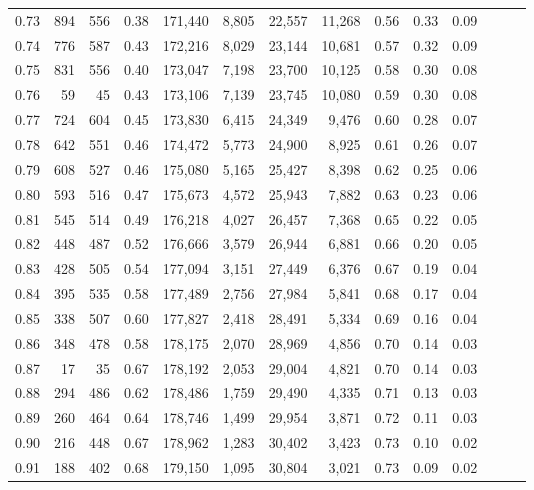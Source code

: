 \begin{tabular}{rrrrrrrrrrrrrr}
0.73 &    894 &  556 &  0.38 &  171,440 &    8,805 &  22,557 &  11,268 &  0.56 &  0.33 &      0.09 \\
0.74 &    776 &  587 &  0.43 &  172,216 &    8,029 &  23,144 &  10,681 &  0.57 &  0.32 &      0.09 \\
0.75 &    831 &  556 &  0.40 &  173,047 &    7,198 &  23,700 &  10,125 &  0.58 &  0.30 &      0.08 \\
0.76 &     59 &   45 &  0.43 &  173,106 &    7,139 &  23,745 &  10,080 &  0.59 &  0.30 &      0.08 \\
0.77 &    724 &  604 &  0.45 &  173,830 &    6,415 &  24,349 &   9,476 &  0.60 &  0.28 &      0.07 \\
0.78 &    642 &  551 &  0.46 &  174,472 &    5,773 &  24,900 &   8,925 &  0.61 &  0.26 &      0.07 \\
0.79 &    608 &  527 &  0.46 &  175,080 &    5,165 &  25,427 &   8,398 &  0.62 &  0.25 &      0.06 \\
0.80 &    593 &  516 &  0.47 &  175,673 &    4,572 &  25,943 &   7,882 &  0.63 &  0.23 &      0.06 \\
0.81 &    545 &  514 &  0.49 &  176,218 &    4,027 &  26,457 &   7,368 &  0.65 &  0.22 &      0.05 \\
0.82 &    448 &  487 &  0.52 &  176,666 &    3,579 &  26,944 &   6,881 &  0.66 &  0.20 &      0.05 \\
0.83 &    428 &  505 &  0.54 &  177,094 &    3,151 &  27,449 &   6,376 &  0.67 &  0.19 &      0.04 \\
0.84 &    395 &  535 &  0.58 &  177,489 &    2,756 &  27,984 &   5,841 &  0.68 &  0.17 &      0.04 \\
0.85 &    338 &  507 &  0.60 &  177,827 &    2,418 &  28,491 &   5,334 &  0.69 &  0.16 &      0.04 \\
0.86 &    348 &  478 &  0.58 &  178,175 &    2,070 &  28,969 &   4,856 &  0.70 &  0.14 &      0.03 \\
0.87 &     17 &   35 &  0.67 &  178,192 &    2,053 &  29,004 &   4,821 &  0.70 &  0.14 &      0.03 \\
0.88 &    294 &  486 &  0.62 &  178,486 &    1,759 &  29,490 &   4,335 &  0.71 &  0.13 &      0.03 \\
0.89 &    260 &  464 &  0.64 &  178,746 &    1,499 &  29,954 &   3,871 &  0.72 &  0.11 &      0.03 \\
0.90 &    216 &  448 &  0.67 &  178,962 &    1,283 &  30,402 &   3,423 &  0.73 &  0.10 &      0.02 \\
0.91 &    188 &  402 &  0.68 &  179,150 &    1,095 &  30,804 &   3,021 &  0.73 &  0.09 &      0.02 \\

\end{tabular}
